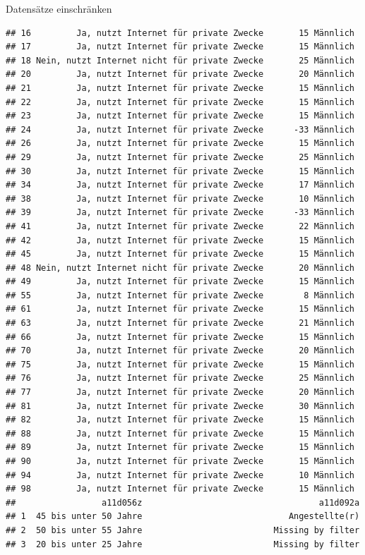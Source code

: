 \documentclass[ignorenonframetext,]{beamer}
\begin{document}
\begin{frame}[fragile]{Datensätze einschränken}
\begin{verbatim}
## 16         Ja, nutzt Internet für private Zwecke       15 Männlich
## 17         Ja, nutzt Internet für private Zwecke       15 Männlich
## 18 Nein, nutzt Internet nicht für private Zwecke       25 Männlich
## 20         Ja, nutzt Internet für private Zwecke       20 Männlich
## 21         Ja, nutzt Internet für private Zwecke       15 Männlich
## 22         Ja, nutzt Internet für private Zwecke       15 Männlich
## 23         Ja, nutzt Internet für private Zwecke       15 Männlich
## 24         Ja, nutzt Internet für private Zwecke      -33 Männlich
## 26         Ja, nutzt Internet für private Zwecke       15 Männlich
## 29         Ja, nutzt Internet für private Zwecke       25 Männlich
## 30         Ja, nutzt Internet für private Zwecke       15 Männlich
## 34         Ja, nutzt Internet für private Zwecke       17 Männlich
## 38         Ja, nutzt Internet für private Zwecke       10 Männlich
## 39         Ja, nutzt Internet für private Zwecke      -33 Männlich
## 41         Ja, nutzt Internet für private Zwecke       22 Männlich
## 42         Ja, nutzt Internet für private Zwecke       15 Männlich
## 45         Ja, nutzt Internet für private Zwecke       15 Männlich
## 48 Nein, nutzt Internet nicht für private Zwecke       20 Männlich
## 49         Ja, nutzt Internet für private Zwecke       15 Männlich
## 55         Ja, nutzt Internet für private Zwecke        8 Männlich
## 61         Ja, nutzt Internet für private Zwecke       15 Männlich
## 63         Ja, nutzt Internet für private Zwecke       21 Männlich
## 66         Ja, nutzt Internet für private Zwecke       15 Männlich
## 70         Ja, nutzt Internet für private Zwecke       20 Männlich
## 75         Ja, nutzt Internet für private Zwecke       15 Männlich
## 76         Ja, nutzt Internet für private Zwecke       25 Männlich
## 77         Ja, nutzt Internet für private Zwecke       20 Männlich
## 81         Ja, nutzt Internet für private Zwecke       30 Männlich
## 82         Ja, nutzt Internet für private Zwecke       15 Männlich
## 88         Ja, nutzt Internet für private Zwecke       15 Männlich
## 89         Ja, nutzt Internet für private Zwecke       15 Männlich
## 90         Ja, nutzt Internet für private Zwecke       15 Männlich
## 94         Ja, nutzt Internet für private Zwecke       10 Männlich
## 98         Ja, nutzt Internet für private Zwecke       15 Männlich
##                 a11d056z                                   a11d092a
## 1  45 bis unter 50 Jahre                             Angestellte(r)
## 2  50 bis unter 55 Jahre                          Missing by filter
## 3  20 bis unter 25 Jahre                          Missing by filter

\end{verbatim}
\end{frame}
\end{document}
